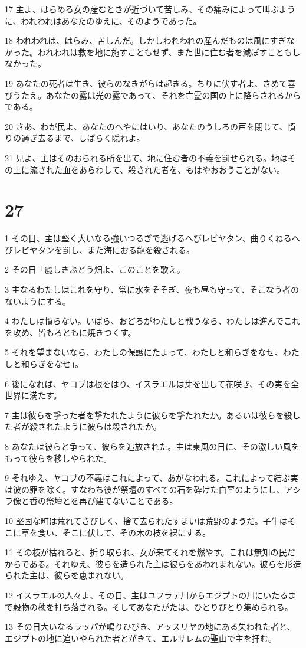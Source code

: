 \par 17 主よ、はらめる女の産むときが近づいて苦しみ、その痛みによって叫ぶように、われわれはあなたのゆえに、そのようであった。
\par 18 われわれは、はらみ、苦しんだ。しかしわれわれの産んだものは風にすぎなかった。われわれは救を地に施すこともせず、また世に住む者を滅ぼすこともしなかった。
\par 19 あなたの死者は生き、彼らのなきがらは起きる。ちりに伏す者よ、さめて喜びうたえ。あなたの露は光の露であって、それを亡霊の国の上に降らされるからである。
\par 20 さあ、わが民よ、あなたのへやにはいり、あなたのうしろの戸を閉じて、憤りの過ぎ去るまで、しばらく隠れよ。
\par 21 見よ、主はそのおられる所を出て、地に住む者の不義を罰せられる。地はその上に流された血をあらわして、殺された者を、もはやおおうことがない。

\chapter{27}

\par 1 その日、主は堅く大いなる強いつるぎで逃げるへびレビヤタン、曲りくねるへびレビヤタンを罰し、また海におる龍を殺される。
\par 2 その日「麗しきぶどう畑よ、このことを歌え。
\par 3 主なるわたしはこれを守り、常に水をそそぎ、夜も昼も守って、そこなう者のないようにする。
\par 4 わたしは憤らない。いばら、おどろがわたしと戦うなら、わたしは進んでこれを攻め、皆もろともに焼きつくす。
\par 5 それを望まないなら、わたしの保護にたよって、わたしと和らぎをなせ、わたしと和らぎをなせ」。
\par 6 後になれば、ヤコブは根をはり、イスラエルは芽を出して花咲き、その実を全世界に満たす。
\par 7 主は彼らを撃った者を撃たれたように彼らを撃たれたか。あるいは彼らを殺した者が殺されたように彼らは殺されたか。
\par 8 あなたは彼らと争って、彼らを追放された。主は東風の日に、その激しい風をもって彼らを移しやられた。
\par 9 それゆえ、ヤコブの不義はこれによって、あがなわれる。これによって結ぶ実は彼の罪を除く。すなわち彼が祭壇のすべての石を砕けた白堊のようにし、アシラ像と香の祭壇とを再び建てないことである。
\par 10 堅固な町は荒れてさびしく、捨て去られたすまいは荒野のようだ。子牛はそこに草を食い、そこに伏して、その木の枝を裸にする。
\par 11 その枝が枯れると、折り取られ、女が来てそれを燃やす。これは無知の民だからである。それゆえ、彼らを造られた主は彼らをあわれまれない。彼らを形造られた主は、彼らを恵まれない。
\par 12 イスラエルの人々よ、その日、主はユフラテ川からエジプトの川にいたるまで穀物の穂を打ち落される。そしてあなたがたは、ひとりびとり集められる。
\par 13 その日大いなるラッパが鳴りひびき、アッスリヤの地にある失われた者と、エジプトの地に追いやられた者とがきて、エルサレムの聖山で主を拝む。

